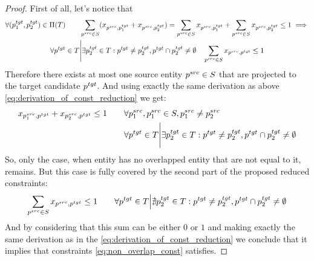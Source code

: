 \begin{proof}
    First of all, let's notice that
    \begin{multline*}
        \forall (p_1^{tgt}, p_2^{tgt}) \in \Pi(T)
        \qquad
        \sum\limits_{p^{src} \in S} (x_{p^{src}, p_1^{tgt}} + x_{p^{src}, p_2^{tgt}})
        =
        \sum\limits_{p^{src} \in S} x_{p^{src}, p_1^{tgt}} +
        \sum\limits_{p^{src} \in S} x_{p^{src}, p_2^{tgt}} \leq 1
        \implies                        \\
        \forall p^{tgt} \in T \Bigg| \exists p_2^{tgt} \in T: p^{tgt} \neq p_2^{tgt}, p^{tgt} \cap p_2^{tgt} \neq \emptyset
        \quad
        \sum\limits_{p^{src} \in S} x_{p^{src}, p^{tgt}} \leq 1
    \end{multline*}
    Therefore there exists at most one source entity \( p^{src} \in S \) that are projected
    to the target candidate \( p^{tgt} \).
    And using exactly the same derivation as above \eqref{eq:derivation_of_const_reduction} we get:
    \begin{align*}
        x_{p_1^{src}, p^{tgt}} + x_{p_2^{src}, p^{tgt}} \leq 1 \qquad
         & \forall p_1^{src}, p_1^{src} \in S, p_1^{src} \neq p_2^{src}                                                        \\
         & \forall p^{tgt} \in T \Bigg| \exists p_2^{tgt} \in T: p^{tgt} \neq p_2^{tgt}, p^{tgt} \cap p_2^{tgt} \neq \emptyset
    \end{align*}
    So, only the case, when entity has no overlapped entity that are
    not equal to it, remains. But this case is fully covered by the second part of the proposed reduced constraints:
    \[
        \sum\limits_{p^{src} \in S} x_{p^{src}, p^{tgt}} \leq 1 \qquad
        \forall p^{tgt} \in T \Big| \nexists p_2^{tgt} \in T: p^{tgt} \neq p_2^{tgt}, p^{tgt} \cap p_2^{tgt} \neq \emptyset
    \]
    And by considering that this sum can be either \( 0 \) or \( 1 \) and making
    exactly the same derivation as in the \eqref{eq:derivation_of_const_reduction} we conclude that it implies that constraints \eqref{eq:non_overlap_const}
    satisfies.
\end{proof}

